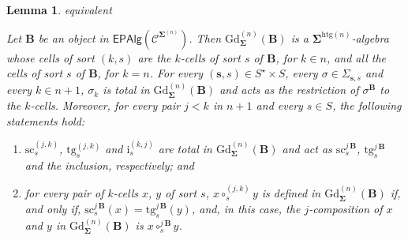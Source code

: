 \documentclass[a4paper, reqno]{amsbook}
\makeatletter
\newcommand{\sig}[1]{\mathbf{#1}}             %
\newcommand{\spec}[1]{\boldsymbol{\mathcal{#1}}} %
\newcommand{\htg}{\mathrm{htg}}                %
\newcommand{\src}{\mathrm{sc}}
\newcommand{\tgt}{\mathrm{tg}}
\newcommand{\Gd}{\mathrm{Gd}}
\theoremstyle{plain}
\newtheorem{lemma}[theorem]{Lemma}
\theoremstyle{definition}
\newcommand*{\CA@leanpending}{}
\newcommand*{\CA@leanrelation}{}
\newcommand*{\lean}[2]{%
  \ifcsname\string\color@lean@#1\endcsname\else
    \PackageError{main}{Unknown relation `#1' in \string\lean}{Use equivalent, weaker or stronger.}%
  \fi
  \gdef\CA@leanrelation{#1}%
  \gdef\CA@leanpending{#2}}
\makeatother
\begin{document}
\begin{lemma}\label{LGdDescription}\lean{equivalent}{Presentations.graduation_transformed,Presentations.graduatedAlgebra}
Let $\mathbf{B}$ be an object in $\mathsf{EPAlg}(\spec{C}^{\sig{\Sigma}^{(n)}})$.
Then $\Gd^{(n)}_{\sig{\Sigma}}(\mathbf{B})$ is a $\sig{\Sigma}^{\htg(n)}$-algebra whose cells of sort $(k,s)$ are the $k$-cells of sort $s$ of $\mathbf{B}$, for $k\in n$, and all the cells of sort $s$ of $\mathbf{B}$, for $k=n$.
For every $(\mathbf{s},s)\in S^{\star}\times S$, every $\sigma\in\Sigma_{\mathbf{s},s}$ and every $k\in n+1$, $\sigma_k$ is total in $\Gd^{(n)}_{\sig{\Sigma}}(\mathbf{B})$ and acts as the restriction of $\sigma^{\mathbf{B}}$ to the $k$-cells.
Moreover, for every pair $j<k$ in $n+1$ and every $s\in S$, the following statements hold:
\begin{enumerate}
\item $\src^{(j,k)}_{s}$, $\tgt^{(j,k)}_{s}$ and $\mathrm{i}^{(k,j)}_{s}$ are total in $\Gd^{(n)}_{\sig{\Sigma}}(\mathbf{B})$ and act as $\src^{j\,\mathbf{B}}_{s}$, $\tgt^{j\,\mathbf{B}}_{s}$ and the inclusion, respectively; and
\item for every pair of $k$-cells $x$, $y$ of sort $s$, $x\circ^{(j,k)}_{s}y$ is defined in $\Gd^{(n)}_{\sig{\Sigma}}(\mathbf{B})$ if, and only if, $\src^{j\,\mathbf{B}}_{s}(x)=\tgt^{j\,\mathbf{B}}_{s}(y)$, and, in this case, the $j$-composition of $x$ and $y$ in $\Gd^{(n)}_{\sig{\Sigma}}(\mathbf{B})$ is $x\circ^{j\,\mathbf{B}}_{s}y$.
\end{enumerate}
\end{lemma}
\end{document}
